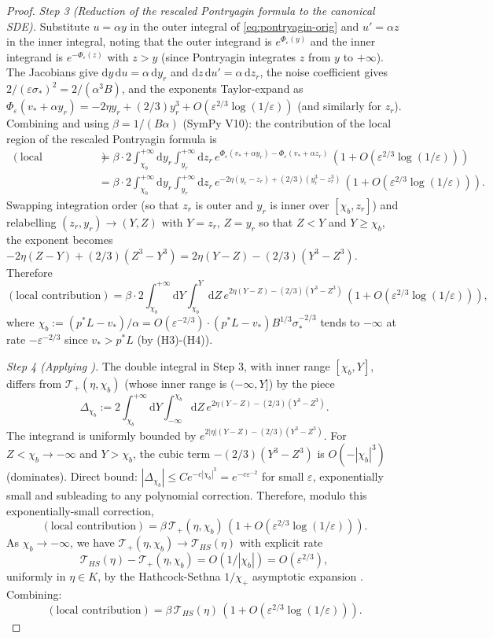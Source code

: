 \documentclass[11pt,a4paper]{article}
\theoremstyle{plain}
\theoremstyle{definition}
\newcommand{\eps}{\varepsilon}
\renewcommand{\d}{\mathrm{d}}
\begin{document}
\begin{proof}
\textit{Step 3 (Reduction of the rescaled Pontryagin formula to the canonical SDE).} Substitute $u = \alpha y$ in the outer integral of \eqref{eq:pontryagin-orig} and $u' = \alpha z$ in the inner integral, noting that the outer integrand is $e^{\Phi_\eps(y)}$ and the inner integrand is $e^{-\Phi_\eps(z)}$ with $z > y$ (since Pontryagin integrates $z$ from $y$ to $+\infty$). The Jacobians give $\d y\,\d u = \alpha\,\d y_r$ and $\d z\,\d u' = \alpha\,\d z_r$, the noise coefficient gives $2/(\eps\sigma_*)^2 = 2/(\alpha^3 B)$, and the exponents Taylor-expand as $\Phi_\eps(v_* + \alpha y_r) = -2\eta y_r + (2/3)y_r^3 + O(\eps^{2/3}\log(1/\eps))$ (and similarly for $z_r$). Combining and using $\beta = 1/(B\alpha)$ (SymPy V10): the contribution of the local region of the rescaled Pontryagin formula is
\begin{align*}
(\text{local contribution}) &= \beta\cdot 2\int_{\chi_b}^{+\infty}\d y_r\int_{y_r}^{+\infty}\d z_r\,e^{\Phi_\eps(v_*+\alpha y_r) - \Phi_\eps(v_*+\alpha z_r)}\,(1 + O(\eps^{2/3}\log(1/\eps)))\\
&= \beta\cdot 2\int_{\chi_b}^{+\infty}\d y_r\int_{y_r}^{+\infty}\d z_r\,e^{-2\eta(y_r - z_r) + (2/3)(y_r^3 - z_r^3)}\,(1 + O(\eps^{2/3}\log(1/\eps))).
\end{align*}
Swapping integration order (so that $z_r$ is outer and $y_r$ is inner over $[\chi_b, z_r]$) and relabelling $(z_r, y_r) \to (Y, Z)$ with $Y = z_r$, $Z = y_r$ so that $Z < Y$ and $Y \geq \chi_b$, the exponent becomes $-2\eta(Z - Y) + (2/3)(Z^3 - Y^3) = 2\eta(Y - Z) - (2/3)(Y^3 - Z^3)$. Therefore
$$(\text{local contribution}) = \beta\cdot 2\int_{\chi_b}^{+\infty}\d Y\int_{\chi_b}^Y\d Z\,e^{2\eta(Y - Z) - (2/3)(Y^3 - Z^3)}\,(1 + O(\eps^{2/3}\log(1/\eps))),$$
where $\chi_b := (p^*L - v_*)/\alpha = O(\eps^{-2/3})\cdot (p^*L - v_*) B^{1/3}\sigma_*^{-2/3}$ tends to $-\infty$ at rate $-\eps^{-2/3}$ since $v_* > p^*L$ (by (H3)-(H4)).

\textit{Step 4 (Applying ).} The double integral in Step 3, with inner range $[\chi_b, Y]$, differs from $\mathcal T_+(\eta, \chi_b)$ (whose inner range is $(-\infty, Y]$) by the piece
$$\Delta_{\chi_b} := 2\int_{\chi_b}^{+\infty}\d Y\int_{-\infty}^{\chi_b}\d Z\,e^{2\eta(Y - Z) - (2/3)(Y^3 - Z^3)}.$$
The integrand is uniformly bounded by $e^{2|\eta|(Y - Z) - (2/3)(Y^3 - Z^3)}$. For $Z < \chi_b \to -\infty$ and $Y > \chi_b$, the cubic term $-(2/3)(Y^3 - Z^3)$ is $O(-|\chi_b|^3)$ (dominates). Direct bound: $|\Delta_{\chi_b}| \leq C e^{-c|\chi_b|^3} = e^{-c\eps^{-2}}$ for small $\eps$, exponentially small and subleading to any polynomial correction. Therefore, modulo this exponentially-small correction,
$$(\text{local contribution}) = \beta\,\mathcal T_+(\eta,\chi_b)\,(1 + O(\eps^{2/3}\log(1/\eps))).$$
As $\chi_b \to -\infty$, we have $\mathcal T_+(\eta,\chi_b) \to \mathcal T_{HS}(\eta)$ with explicit rate
$$\mathcal T_{HS}(\eta) - \mathcal T_+(\eta, \chi_b) = O(1/|\chi_b|) = O(\eps^{2/3}),$$
uniformly in $\eta \in K$, by the Hathcock-Sethna $1/\chi_+$ asymptotic expansion \cite[Eqs.~17-19]{HathcockSethna2021}. Combining:
$$(\text{local contribution}) = \beta\,\mathcal T_{HS}(\eta)\,(1 + O(\eps^{2/3}\log(1/\eps))).$$


\end{proof}
\end{document}
